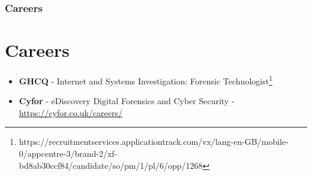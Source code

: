 \documentclass{beamer}
\begin{document}
\begin{frame}
	\frametitle{Careers}
	\section{Careers}
	\begin{itemize}
		\item \textbf{GHCQ} - Internet and Systems Investigation: Forensic Technologist\footnote{https://recruitmentservices.applicationtrack.com/vx/lang-en-GB/mobile-0/appcentre-3/brand-2/xf-bd8ab30ccf84/candidate/so/pm/1/pl/6/opp/1268}
		\item \textbf{Cyfor} - eDiscovery Digital Forensics and Cyber Security - \url{https://cyfor.co.uk/careers/}
	\end{itemize}
\end{frame}
\end{document}
